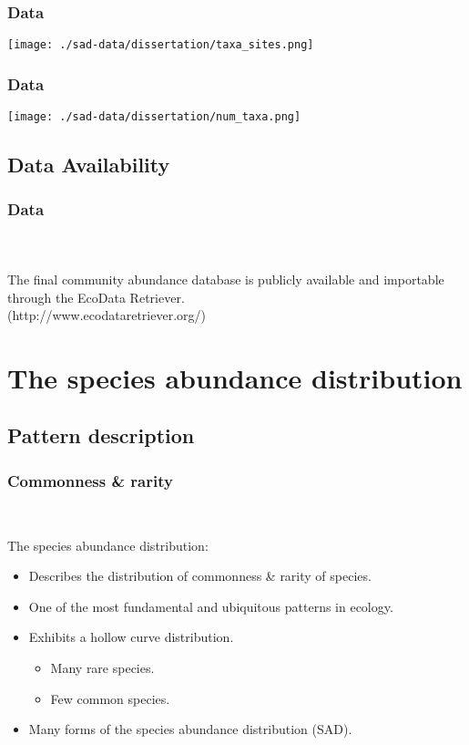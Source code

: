 \documentclass[14pt]{beamer}
\begin{document}
\begin{frame}{}
\frametitle{Data}
\texttt{[image: ./sad-data/dissertation/taxa\_sites.png]}
\end{frame}

\begin{frame}{}
\frametitle{Data}
\texttt{[image: ./sad-data/dissertation/num\_taxa.png]}
\end{frame}

\subsection{Data Availability}
\begin{frame}[t]
\frametitle{Data}
~\\
~\\
The final community abundance database is publicly available and importable through the EcoData Retriever.\\ 
(http://www.ecodataretriever.org/)
\end{frame}

\section{The species abundance distribution}
\subsection{Pattern description}
\begin{frame}[t]{}
\frametitle{Commonness \& rarity}
~\\
\begin{large}
The species abundance distribution:
\end{large}
\begin{itemize}
\item Describes the distribution of commonness \& rarity of species.
\item One of the most fundamental and ubiquitous patterns in ecology.
\item Exhibits a hollow curve distribution.
\begin{itemize}
\item Many rare species.
\item Few common species.
~\\
\end{itemize}
\item Many forms of the species abundance distribution (SAD).
\end{itemize}
\end{frame}
\end{document}
